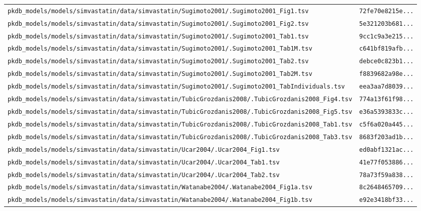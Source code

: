 \begin{longtable}{ll}
\texttt{pkdb\_models/models/simvastatin/data/simvastatin/Sugimoto2001/.Sugimoto2001\_Fig1.tsv} & \texttt{72fe70e8215e...} \\
\texttt{pkdb\_models/models/simvastatin/data/simvastatin/Sugimoto2001/.Sugimoto2001\_Fig2.tsv} & \texttt{5e321203b681...} \\
\texttt{pkdb\_models/models/simvastatin/data/simvastatin/Sugimoto2001/.Sugimoto2001\_Tab1.tsv} & \texttt{9cc1c9a3e215...} \\
\texttt{pkdb\_models/models/simvastatin/data/simvastatin/Sugimoto2001/.Sugimoto2001\_Tab1M.tsv} & \texttt{c641bf819afb...} \\
\texttt{pkdb\_models/models/simvastatin/data/simvastatin/Sugimoto2001/.Sugimoto2001\_Tab2.tsv} & \texttt{debce0c823b1...} \\
\texttt{pkdb\_models/models/simvastatin/data/simvastatin/Sugimoto2001/.Sugimoto2001\_Tab2M.tsv} & \texttt{f8839682a98e...} \\
\texttt{pkdb\_models/models/simvastatin/data/simvastatin/Sugimoto2001/.Sugimoto2001\_TabIndividuals.tsv} & \texttt{eea3aa7d8039...} \\
\texttt{pkdb\_models/models/simvastatin/data/simvastatin/TubicGrozdanis2008/.TubicGrozdanis2008\_Fig4.tsv} & \texttt{774a13f61f98...} \\
\texttt{pkdb\_models/models/simvastatin/data/simvastatin/TubicGrozdanis2008/.TubicGrozdanis2008\_Fig5.tsv} & \texttt{e36a5393833c...} \\
\texttt{pkdb\_models/models/simvastatin/data/simvastatin/TubicGrozdanis2008/.TubicGrozdanis2008\_Tab1.tsv} & \texttt{c5f6a020a445...} \\
\texttt{pkdb\_models/models/simvastatin/data/simvastatin/TubicGrozdanis2008/.TubicGrozdanis2008\_Tab3.tsv} & \texttt{8683f203ad1b...} \\
\texttt{pkdb\_models/models/simvastatin/data/simvastatin/Ucar2004/.Ucar2004\_Fig1.tsv} & \texttt{ed0abf1321ac...} \\
\texttt{pkdb\_models/models/simvastatin/data/simvastatin/Ucar2004/.Ucar2004\_Tab1.tsv} & \texttt{41e77f053886...} \\
\texttt{pkdb\_models/models/simvastatin/data/simvastatin/Ucar2004/.Ucar2004\_Tab2.tsv} & \texttt{78a73f59a838...} \\
\texttt{pkdb\_models/models/simvastatin/data/simvastatin/Watanabe2004/.Watanabe2004\_Fig1a.tsv} & \texttt{8c2648465709...} \\
\texttt{pkdb\_models/models/simvastatin/data/simvastatin/Watanabe2004/.Watanabe2004\_Fig1b.tsv} & \texttt{e92e3418bf33...} \\

\end{longtable}
